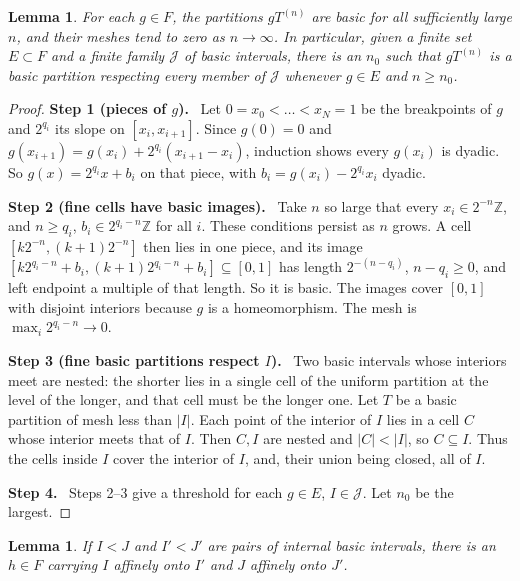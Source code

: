 \documentclass[11pt]{article}
\newcommand{\Z}{\mathbb Z}
\newcommand{\step}[1]{\par\smallskip\noindent\textbf{Step #1.}\ }
\newtheorem{lemma}[theorem]{Lemma}
\theoremstyle{definition}
\numberwithin{equation}{section}
\begin{document}
\begin{lemma}\label{dyad:eventual}
For each $g\in F$, the partitions $gT^{(n)}$ are basic for all sufficiently
large $n$, and their meshes tend to zero as $n\to\infty$. In particular,
given a finite set $E\subset F$ and a finite family $\mathcal J$ of basic
intervals, there is an $n_0$ such that $gT^{(n)}$ is a basic partition
respecting every member of $\mathcal J$ whenever $g\in E$ and $n\ge n_0$.
\end{lemma}

\begin{proof}
\step{1 (pieces of $g$)} Let $0=x_0<\dots<x_N=1$ be the breakpoints of $g$
and $2^{q_i}$ its slope on $[x_i,x_{i+1}]$. Since $g(0)=0$ and
$g(x_{i+1})=g(x_i)+2^{q_i}(x_{i+1}-x_i)$, induction shows every $g(x_i)$ is
dyadic. So $g(x)=2^{q_i}x+b_i$ on that piece, with
$b_i=g(x_i)-2^{q_i}x_i$ dyadic.

\step{2 (fine cells have basic images)} Take $n$ so large that every
$x_i\in2^{-n}\Z$, and $n\ge q_i$, $b_i\in2^{q_i-n}\Z$ for all $i$. These
conditions persist as $n$ grows. A cell $[k2^{-n},(k+1)2^{-n}]$ then lies in
one piece, and its image $[k2^{q_i-n}+b_i,(k+1)2^{q_i-n}+b_i]\subseteq[0,1]$
has length $2^{-(n-q_i)}$, $n-q_i\ge0$, and left endpoint a multiple of that
length. So it is basic. The images cover $[0,1]$ with disjoint interiors
because $g$ is a homeomorphism. The mesh is $\max_i2^{q_i-n}\to0$.

\step{3 (fine basic partitions respect $I$)} Two basic intervals whose
interiors meet are nested: the shorter lies in a single cell of the uniform
partition at the level of the longer, and that cell must be the longer one.
Let $T$ be a basic partition of mesh less than $|I|$. Each point of the
interior of $I$ lies in a cell $C$ whose interior meets that of $I$. Then
$C,I$ are nested and $|C|<|I|$, so $C\subseteq I$. Thus the cells inside
$I$ cover the interior of $I$, and, their union being closed, all of $I$.

\step{4} Steps 2--3 give a threshold for each $g\in E$, $I\in\mathcal J$.
Let $n_0$ be the largest.
\end{proof}

\begin{lemma}\label{dyad:transport}
If $I<J$ and $I'<J'$ are pairs of internal basic intervals, there is an
$h\in F$ carrying $I$ affinely onto $I'$ and $J$ affinely onto $J'$.
\end{lemma}
\end{document}

